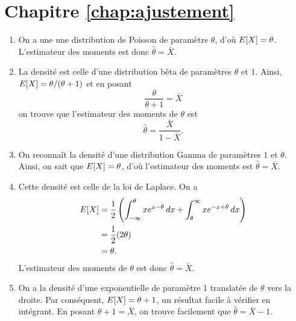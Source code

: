\section*{Chapitre \ref{chap:ajustement}}

\begin{solution}{4.1}
    \begin{enumerate}
    \item On a une une distribution de Poisson de paramètre $\theta$,
      d'où $E [ X ] = \theta$. L'estimateur des moments est donc
      $\hat{\theta} = \bar{X}$.
    \item La densité est celle d'une distribution bêta de paramètres
      $\theta$ et $1$. Ainsi, $E [ X ] = \theta/(\theta + 1)$ et en posant
      \begin{equation*}
        \frac{\theta}{\theta + 1} = \bar{X}
      \end{equation*}
      on trouve que l'estimateur des moments de $\theta$ est
      \begin{equation*}
        \hat{\theta} = \frac{\bar{X}}{1 - \bar{X}}.
      \end{equation*}
    \item On reconnaît la densité d'une distribution Gamma de
      paramètres $1$ et $\theta$. Ainsi, on sait que $E [ X ] =
      \theta$, d'où l'estimateur des moments est $\hat{\theta} =
      \bar{X}$.
    \item Cette densité est celle de la loi de Laplace. On a
      \begin{align*}
        E [ X ] &= \frac{1}{2}
        \left(
          \int_{-\infty}^\theta x e^{x-\theta}\, dx +
          \int_{\theta}^\infty xe^{-x + \theta}\, dx
        \right) \\
        &= \frac{1}{2}(2\theta)\\
        &= \theta.
      \end{align*}
      L'estimateur des moments de $\theta$ est donc $\hat{\theta} =
      \bar{X}$.
    \item On a la densité d'une exponentielle de paramètre 1
      translatée de $\theta$ vers la droite. Par conséquent,
      $E [ X ] = \theta + 1$, un résultat facile à vérifier en
      intégrant. En posant $\theta + 1 = \bar{X}$, on trouve
      facilement que $\hat{\theta} = \bar{X} - 1$.
    \end{enumerate}
  
\end{solution}
